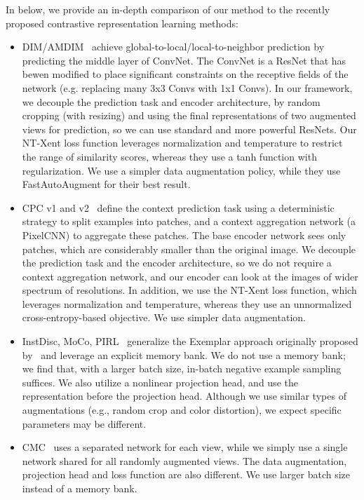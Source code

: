 \documentclass{article}
\begin{document}
In below, we provide an in-depth comparison of our method to the recently proposed contrastive representation learning methods:
\begin{itemize}
    \item DIM/AMDIM~\cite{hjelm2018learning,bachman2019learning} achieve global-to-local/local-to-neighbor prediction by predicting the middle layer of ConvNet. The ConvNet is a ResNet that has bewen modified to place significant constraints on the receptive fields of the network (e.g. replacing many 3x3 Convs with 1x1 Convs). In our framework, we decouple the prediction task and encoder architecture, by random cropping (with resizing) and using the final representations of two augmented views for prediction, so we can use standard and more powerful ResNets. Our NT-Xent loss function leverages normalization and temperature to restrict the range of similarity scores, whereas they use a tanh function with regularization. We use a simpler data augmentation policy, while they use FastAutoAugment for their best result.
    \item CPC v1 and v2~\cite{oord2018representation,henaff2019data} define the context prediction task using a deterministic strategy to split examples into patches, and a context aggregation network (a PixelCNN) to aggregate these patches. The base encoder network sees only patches, which are considerably smaller than the original image. We decouple the prediction task and the encoder architecture, so we do not require a context aggregation network, and our encoder can look at the images of wider spectrum of resolutions. In addition, we use the NT-Xent loss function, which leverages normalization and temperature, whereas they use an unnormalized cross-entropy-based objective. We use simpler data augmentation.
    \item InstDisc, MoCo, PIRL~\cite{wu2018unsupervised,he2019momentum,misra2019self} generalize the Exemplar approach originally proposed by~\citet{dosovitskiy2014discriminative} and leverage an explicit memory bank. We do not use a memory bank; we find that, with a larger batch size, in-batch negative example sampling suffices. We also utilize a nonlinear projection head, and use the representation before the projection head. Although we use similar types of augmentations (e.g., random crop and color distortion), we expect specific parameters may be different.
    \item CMC~\cite{tian2019contrastive} uses a separated network for each view, while we simply use a single network shared for all randomly augmented views. The data augmentation, projection head and loss function are also different. We use larger batch size instead of a memory bank.

\end{itemize}
\end{document}

